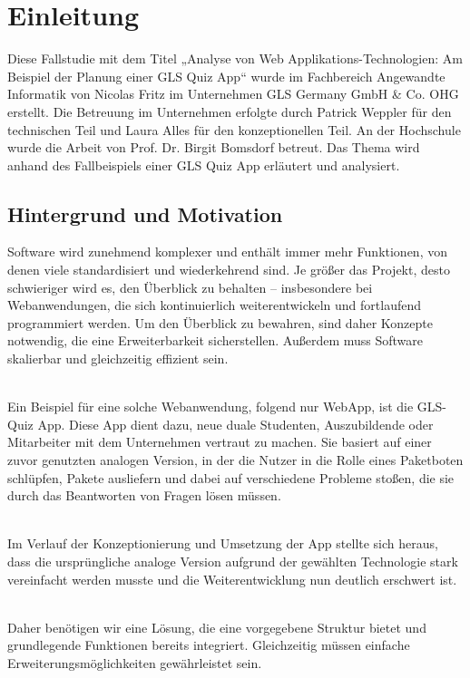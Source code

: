 \documentclass[biblatex]{lni}
\begin{document}
\section{Einleitung}
Diese Fallstudie mit dem Titel „Analyse von Web Applikations-Technologien: Am Beispiel der Planung einer GLS Quiz App“
wurde im Fachbereich Angewandte Informatik von Nicolas Fritz im Unternehmen GLS Germany GmbH & Co. OHG erstellt.
Die Betreuung im Unternehmen erfolgte durch Patrick Weppler für den technischen Teil und Laura Alles für den konzeptionellen Teil.
An der Hochschule wurde die Arbeit von Prof. Dr. Birgit Bomsdorf betreut.
Das Thema wird anhand des Fallbeispiels einer GLS Quiz App erläutert und analysiert.

\subsection{Hintergrund und Motivation}
Software wird zunehmend komplexer und enthält immer mehr Funktionen, von denen viele standardisiert und wiederkehrend sind.
Je größer das Projekt, desto schwieriger wird es, den Überblick zu behalten – insbesondere bei Webanwendungen,
die sich kontinuierlich weiterentwickeln und fortlaufend programmiert werden.
Um den Überblick zu bewahren, sind daher Konzepte notwendig, die eine Erweiterbarkeit sicherstellen.
Außerdem muss Software skalierbar und gleichzeitig effizient sein.

\\

Ein Beispiel für eine solche Webanwendung, folgend nur WebApp, ist die GLS-Quiz App.
Diese App dient dazu, neue duale Studenten, Auszubildende oder Mitarbeiter mit dem Unternehmen vertraut zu machen.
Sie basiert auf einer zuvor genutzten analogen Version, in der die Nutzer in die Rolle eines Paketboten schlüpfen,
Pakete ausliefern und dabei auf verschiedene Probleme stoßen, die sie durch das Beantworten von Fragen lösen müssen.

\\

Im Verlauf der Konzeptionierung und Umsetzung der App stellte sich heraus,
dass die ursprüngliche analoge Version aufgrund der gewählten Technologie stark vereinfacht werden musste
und die Weiterentwicklung nun deutlich erschwert ist.

\\

Daher benötigen wir eine Lösung,
die eine vorgegebene Struktur bietet und grundlegende Funktionen bereits integriert.
Gleichzeitig müssen einfache Erweiterungsmöglichkeiten gewährleistet sein.
\end{document}

